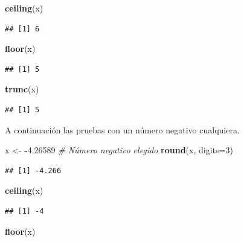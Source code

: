 \documentclass[10pt,]{krantz}
\makeatletter
\newenvironment{Shaded}{\begin{snugshade}}{\end{snugshade}}
\newcommand{\KeywordTok}[1]{\textcolor[rgb]{0.13,0.29,0.53}{\textbf{#1}}}
\newcommand{\DataTypeTok}[1]{\textcolor[rgb]{0.13,0.29,0.53}{#1}}
\newcommand{\DecValTok}[1]{\textcolor[rgb]{0.00,0.00,0.81}{#1}}
\newcommand{\FloatTok}[1]{\textcolor[rgb]{0.00,0.00,0.81}{#1}}
\newcommand{\StringTok}[1]{\textcolor[rgb]{0.31,0.60,0.02}{#1}}
\newcommand{\CommentTok}[1]{\textcolor[rgb]{0.56,0.35,0.01}{\textit{#1}}}
\newcommand{\OperatorTok}[1]{\textcolor[rgb]{0.81,0.36,0.00}{\textbf{#1}}}
\newcommand{\NormalTok}[1]{#1}
\newenvironment{kframe}{%
\medskip{}
\setlength{\fboxsep}{.8em}
 \def\at@end@of@kframe{}%
 \ifinner\ifhmode%
  \def\at@end@of@kframe{\end{minipage}}%
  \begin{minipage}{\columnwidth}%
 \fi\fi%
 \def\FrameCommand##1{\hskip\@totalleftmargin \hskip-\fboxsep
 \colorbox{shadecolor}{##1}\hskip-\fboxsep
     \hskip-\linewidth \hskip-\@totalleftmargin \hskip\columnwidth}%
 \MakeFramed {\advance\hsize-\width
   \@totalleftmargin\z@ \linewidth\hsize
   \@setminipage}}%
 {\par\unskip\endMakeFramed%
 \at@end@of@kframe}
\renewenvironment{Shaded}{\begin{kframe}}{\end{kframe}}
\makeatother
\begin{document}
\begin{Shaded}
\begin{Highlighting}[]
\KeywordTok{ceiling}\NormalTok{(x)}
\end{Highlighting}
\end{Shaded}

\begin{verbatim}
## [1] 6
\end{verbatim}

\begin{Shaded}
\begin{Highlighting}[]
\KeywordTok{floor}\NormalTok{(x)}
\end{Highlighting}
\end{Shaded}

\begin{verbatim}
## [1] 5
\end{verbatim}

\begin{Shaded}
\begin{Highlighting}[]
\KeywordTok{trunc}\NormalTok{(x)}
\end{Highlighting}
\end{Shaded}

\begin{verbatim}
## [1] 5
\end{verbatim}

A continuación las pruebas con un número negativo cualquiera.

\begin{Shaded}
\begin{Highlighting}[]
\NormalTok{x <-}\StringTok{ }\OperatorTok{-}\FloatTok{4.26589}  \CommentTok{# Número negativo elegido}
\KeywordTok{round}\NormalTok{(x, }\DataTypeTok{digits=}\DecValTok{3}\NormalTok{)}
\end{Highlighting}
\end{Shaded}

\begin{verbatim}
## [1] -4.266
\end{verbatim}

\begin{Shaded}
\begin{Highlighting}[]
\KeywordTok{ceiling}\NormalTok{(x)}
\end{Highlighting}
\end{Shaded}

\begin{verbatim}
## [1] -4
\end{verbatim}

\begin{Shaded}
\begin{Highlighting}[]
\KeywordTok{floor}\NormalTok{(x)}
\end{Highlighting}
\end{Shaded}
\end{document}

